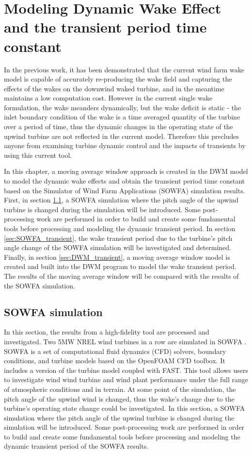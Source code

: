 \documentclass{umthesis}
\begin{document}
\chapter{Modeling Dynamic Wake Effect and the transient period time constant}
In the previous work, it has been demonstrated that the current wind farm wake model is capable of accurately re-producing the wake field and capturing the effects of the wakes on the downwind waked turbine, and in the meantime maintains a low computation cost. However in the current single wake formulation, the wake meanders dynamically, but the wake deficit is static - the inlet boundary condition of the wake is a time averaged quantity of the turbine over a period of time, thus the dynamic changes in the operating state of the upwind turbine are not reflected in the current model. Therefore this precludes anyone from examining turbine dynamic control and the impacts of transients by using this current tool.

In this chapter, a moving average window approach is created in the DWM model to model the dynamic wake effects and obtain the transient period time constant based on the Simulator of Wind Farm Applications (SOWFA) simulation results. First, in section \ref{sec:SOWFA_dynamic}, a SOWFA simulation where the pitch angle of the upwind turbine is changed during the simulation will be introduced. Some post-processing work are performed in order to build and create some fundamental tools before processing and modeling the dynamic transient period. In section \ref{sec:SOWFA_transient}, the wake transient period due to the turbine's pitch angle change of the SOWFA simulation will be investigated and determined. Finally, in section \ref{sec:DWM_transient}, a moving average window model is created and built into the DWM program to model the wake transient period. The results of the moving average window will be compared with the results of the SOWFA simulation.

\section{SOWFA simulation}\label{sec:SOWFA_dynamic}
In this section, the results from a high-fidelity tool are processed and investigated. Two 5MW NREL wind turbines in a row are simulated in SOWFA \cite{SOWFA}. SOWFA is a set of computational fluid dynamics (CFD) solvers, boundary conditions, and turbine models based on the OpenFOAM CFD toolbox. It includes a version of the turbine model coupled with FAST. This tool allows users to investigate wind wind turbine and wind plant performance under the full range of atmospheric conditions and in terrain. At some point of the simulation, the pitch angle of the upwind wind is changed, thus the wake's change due to the turbine's operating state change could be investigated. In this section, a SOWFA simulation where the pitch angle of the upwind turbine is changed during the simulation will be introduced. Some post-processing work are performed in order to build and create some fundamental tools before processing and modeling the dynamic transient period of the SOWFA results.
\end{document}
